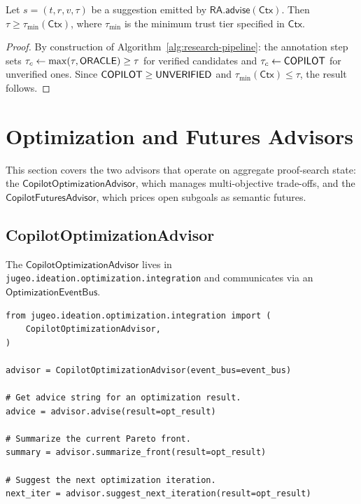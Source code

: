 \documentclass[11pt]{article}
\newcommand{\RA}{\mathsf{RA}}
\newcommand{\Context}{\mathsf{Ctx}}
\begin{document}
\begin{theorem}\label{thm:trust-mono}
Let $s = (t, r, v, \tau)$ be a suggestion emitted by
$\RA.\mathsf{advise}(\Context)$.  Then
$\tau \geq \tau_{\min}(\Context)$, where $\tau_{\min}$ is the
minimum trust tier specified in $\Context$.
\end{theorem}
\begin{proof}
By construction of Algorithm~\ref{alg:research-pipeline}: the
annotation step sets $\tau_c \gets \max(\tau, \mathsf{ORACLE}) \geq \tau$
for verified candidates and $\tau_c \gets \mathsf{COPILOT}$ for
unverified ones.  Since $\mathsf{COPILOT} \geq \mathsf{UNVERIFIED}$ and
$\tau_{\min}(\Context) \leq \tau$, the result follows.
\end{proof}

\section{Optimization and Futures Advisors}
\label{sec:opt-futures}

This section covers the two advisors that operate on aggregate
proof-search state: the $\mathsf{CopilotOptimizationAdvisor}$,
which manages multi-objective trade-offs, and the
$\mathsf{CopilotFuturesAdvisor}$, which prices open subgoals as
semantic futures.

\subsection{CopilotOptimizationAdvisor}\label{sec:opt-advisor}

The $\mathsf{CopilotOptimizationAdvisor}$ lives in
\texttt{jugeo.ideation.optimization.integration} and
communicates via an $\mathsf{OptimizationEventBus}$.

\begin{lstlisting}[style=jugeo-python,caption={CopilotOptimizationAdvisor core interface.},label={lst:opt-advisor}]
from jugeo.ideation.optimization.integration import (
    CopilotOptimizationAdvisor,
)

advisor = CopilotOptimizationAdvisor(event_bus=event_bus)

# Get advice string for an optimization result.
advice = advisor.advise(result=opt_result)

# Summarize the current Pareto front.
summary = advisor.summarize_front(result=opt_result)

# Suggest the next optimization iteration.
next_iter = advisor.suggest_next_iteration(result=opt_result)
\end{lstlisting}
\end{document}
